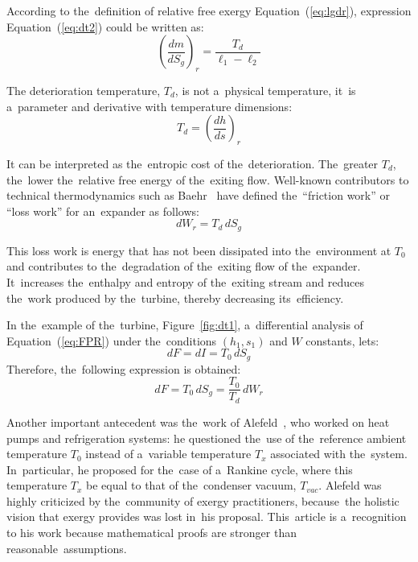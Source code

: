 \documentclass[energies,article,accept,moreauthors,pdftex]{Definitions/mdpi}
\begin{document}
According to the~definition of relative free exergy Equation~(\ref{eq:lgdr}), expression Equation~(\ref{eq:dt2}) could be written as:
\begin{equation}
\left(\frac{dm}{dS_g}\right)_r = \frac{T_d}{\ell_1 - \ell_2}
\label{eq:dt2g}
\end{equation}

The deterioration temperature, $T_d$, is not a~physical temperature, it~is a~parameter and derivative with temperature dimensions:
\begin{equation}
T_d=\left(\frac{dh}{ds}\right)_r
\end{equation}

It can be interpreted as the~entropic cost of the~deterioration. The~greater $T_d$, the~lower the~relative free energy of the~exiting flow.
Well-known contributors to technical thermodynamics such as Baehr~\cite{Baehr2005} have defined the~“friction work” or “loss work” for an~expander as follows:
\begin{equation}
	dW_r=T_d\,dS_g
\end{equation}

This loss work is energy that has not been dissipated into the~environment at $T_0$ and contributes to the~degradation of the~exiting flow of the~expander. It~increases the~enthalpy and entropy of the~exiting stream and reduces the~work produced by the~turbine, thereby decreasing its~efficiency.

In the~example of the~turbine, Figure~\ref{fig:dt1}, a~differential analysis of Equation~(\ref{eq:FPR}) under the~conditions $(h_1,s_1)$ and $W$ constants, lets:
\begin{equation}
dF=dI=T_0\,dS_g
\label{eq:dfi}
\end{equation}
Therefore, the~following expression is obtained:
\begin{equation}
dF=T_0\,dS_g=\frac{T_0}{T_d}\,dW_r
\end{equation}

Another important antecedent was the~work of Alefeld~\cite{Alefeld1988}, who worked on heat pumps and refrigeration systems: he questioned the~use of the~reference ambient temperature $T_0$ instead of a~variable temperature $T_x$ associated with the~system. In~particular, he proposed for the~case of a~Rankine cycle, where this temperature $T_x$ be equal to that of the~condenser vacuum, $T_{vac}$. Alefeld was highly criticized by the~community of exergy practitioners, because~the holistic vision that exergy provides was lost in~his proposal. This~article is a~recognition to his work because mathematical proofs are stronger than reasonable~assumptions.
\end{document}
